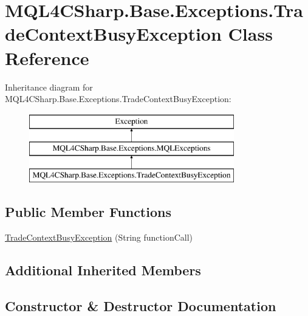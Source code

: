\hypertarget{class_m_q_l4_c_sharp_1_1_base_1_1_exceptions_1_1_trade_context_busy_exception}{}\section{M\+Q\+L4\+C\+Sharp.\+Base.\+Exceptions.\+Trade\+Context\+Busy\+Exception Class Reference}
\label{class_m_q_l4_c_sharp_1_1_base_1_1_exceptions_1_1_trade_context_busy_exception}
Inheritance diagram for M\+Q\+L4\+C\+Sharp.\+Base.\+Exceptions.\+Trade\+Context\+Busy\+Exception\+:\begin{figure}[H]
\begin{center}
\leavevmode
\includegraphics[height=3.000000cm]{class_m_q_l4_c_sharp_1_1_base_1_1_exceptions_1_1_trade_context_busy_exception}
\end{center}
\end{figure}
\subsection*{Public Member Functions}
\begin{DoxyCompactItemize}
\item 
\hyperlink{class_m_q_l4_c_sharp_1_1_base_1_1_exceptions_1_1_trade_context_busy_exception_ada9a6f51baee33fffe84d0fb58fcbdb4}{Trade\+Context\+Busy\+Exception} (String function\+Call)
\end{DoxyCompactItemize}
\subsection*{Additional Inherited Members}


\subsection{Constructor \& Destructor Documentation}
